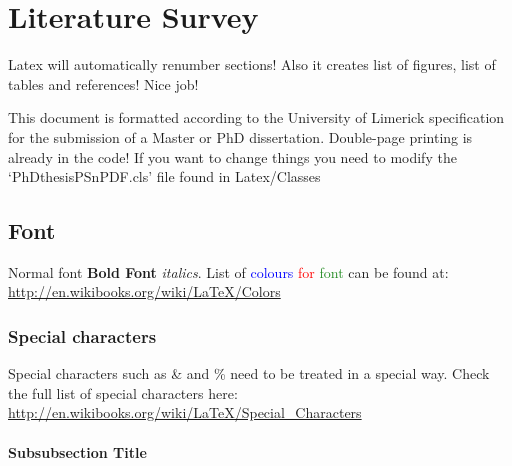 

\chapter{Literature Survey} %


\ifpdf
    \graphicspath{{2_chapter2/figures/PNG/}{2_chapter2/figures/PDF/}{2_chapter2/figures/}}
\else
    \graphicspath{{2_chapter2/figures/EPS/}{2_chapter2/figures/}}
\fi


Latex will automatically renumber sections! Also it creates list of figures, list of tables and references! Nice job!


This document is formatted according to the University of Limerick specification for the submission of a Master or PhD dissertation.
Double-page printing is already in the code!
If you want to change things  you need to modify the `PhDthesisPSnPDF.cls' file found in Latex/Classes 




\section{Font}

Normal font \textbf{Bold Font} \emph{italics}.  List of \textcolor{blue}{colours} \textcolor{red}{for} \textcolor{ForestGreen}{font} can be found at: \url{http://en.wikibooks.org/wiki/LaTeX/Colors}

\subsection{Special characters}

Special characters such as \& and \% need to be treated in a special way. Check the full list of special characters here: \url{http://en.wikibooks.org/wiki/LaTeX/Special_Characters}
\subsubsection{Subsubsection Title}

